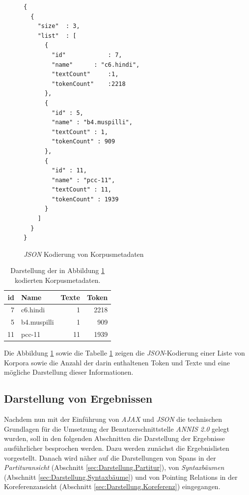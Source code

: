 \begin{figure}[H]
\scriptsize
\begin{verbatim}
{
  {
    "size"	: 3,
    "list"	: [
      {
        "id"			: 7,
        "name"		: "c6.hindi",
        "textCount"		:1,
        "tokenCount"	:2218
      },
      {
        "id" : 5,
        "name" : "b4.muspilli",
        "textCount" : 1,
        "tokenCount" : 909
      },
      {
        "id" : 11,
        "name" : "pcc-11",
        "textCount" : 11,
        "tokenCount" : 1939
      }
    ]
  }
}
\end{verbatim}
\caption{\emph{JSON} Kodierung von Korpusmetadaten}\label{src:JSONExample}
\end{figure}


\begin{table}[H]
	
		\centering
		\begin{tabular}{r | l r r}
					id & Name & Texte & Token\\
					\hline
					7 	&	c6.hindi		& 1	& 2218 	\\
					5	&	b4.muspilli	& 1	& 909	\\
					11	&	pcc-11		& 11	& 1939	
		\end{tabular}
		\caption{Darstellung der in Abbildung \ref{src:JSONExample} kodierten Korpusmetadaten.}\label{tab:JSONExample}
\end{table}


Die Abbildung \ref{src:JSONExample} sowie die Tabelle \ref{tab:JSONExample} zeigen die \emph{JSON}-Kodierung einer Liste von Korpora sowie die Anzahl der darin enthaltenen Token und Texte und eine mögliche Darstellung dieser Informationen.




\subsection{Darstellung von Ergebnissen}\label{sec:Ergebnislisten}

Nachdem nun mit der Einführung von \emph{AJAX} und \emph{JSON} die technischen Grundlagen für die Umsetzung der Benutzerschnittstelle \emph{ANNIS 2.0} gelegt wurden, soll in den folgenden Abschnitten die Darstellung der Ergebnisse ausführlicher besprochen werden.  Dazu werden zunächst die Ergebnislisten vorgestellt. Danach wird näher auf die Darstellungen von Spans in der \emph{Partituransicht} (Abschnitt \ref{sec:Darstellung.Partitur}), von \emph{Syntaxbäumen} (Abschnitt \ref{sec:Darstellung.Syntaxbäume}) und von Pointing Relations in der Koreferenzansicht (Abschnitt \ref{sec:Darstellung.Koreferenz}) eingegangen.

